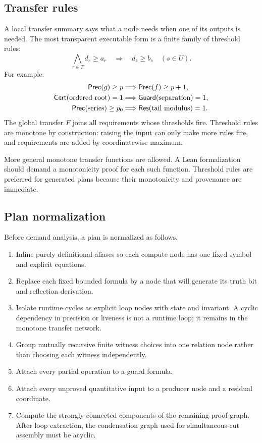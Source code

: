 \subsection{Transfer rules}

A local transfer summary says what a node needs when one of its outputs is
needed.  The most transparent executable form is a finite family of threshold
rules:
\[
  \bigwedge_{r\in T} d_r\ge a_r
  \quad\Longrightarrow\quad
  d_s\ge b_s\quad(s\in U).
\]
For example:
\begin{align*}
  \mathsf{Prec}(g)\ge p &\Longrightarrow \mathsf{Prec}(f)\ge p+1,\\
  \mathsf{Cert}(\text{ordered root})=1
    &\Longrightarrow \mathsf{Guard}(\text{separation})=1,\\
  \mathsf{Prec}(\text{series})\ge p_0
    &\Longrightarrow \mathsf{Res}(\text{tail modulus})=1.
\end{align*}
The global transfer \(F\) joins all requirements whose thresholds fire.
Threshold rules are monotone by construction: raising the input can only make
more rules fire, and requirements are added by coordinatewise maximum.

More general monotone transfer functions are allowed.  A Lean formalization
should demand a monotonicity proof for each such function.  Threshold rules are
preferred for generated plans because their monotonicity and provenance are
immediate.

\subsection{Plan normalization}

Before demand analysis, a plan is normalized as follows.
\begin{enumerate}
  \item Inline purely definitional aliases so each compute node has one fixed
        symbol and explicit equations.
  \item Replace each fixed bounded formula by a node that will generate its
        truth bit and reflection derivation.
  \item Isolate runtime cycles as explicit loop nodes with state and invariant.
        A cyclic dependency in precision or liveness is not a runtime loop; it
        remains in the monotone transfer network.
  \item Group mutually recursive finite witness choices into one relation node
        rather than choosing each witness independently.
  \item Attach every partial operation to a guard formula.
  \item Attach every unproved quantitative input to a producer node and a
        residual coordinate.
  \item Compute the strongly connected components of the remaining proof
        graph.  After loop extraction, the condensation graph used for
        simultaneous-cut assembly must be acyclic.
\end{enumerate}

